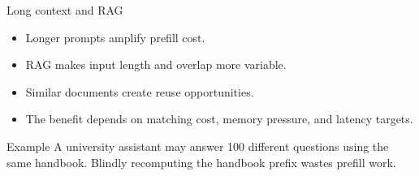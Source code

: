 \documentclass[aspectratio=169,11pt]{beamer}
\begin{document}
\fi

\begin{frame}{Long context and RAG}
  \begin{itemize}
    \item Longer prompts amplify prefill cost.
    \item RAG makes input length and overlap more variable.
    \item Similar documents create reuse opportunities.
    \item The benefit depends on matching cost, memory pressure, and latency targets.
  \end{itemize}
  \vspace{0.35cm}
  \begin{block}{Example}
    A university assistant may answer 100 different questions using the same handbook. Blindly recomputing the handbook prefix wastes prefill work.
  \end{block}
\end{frame}
\end{document}
